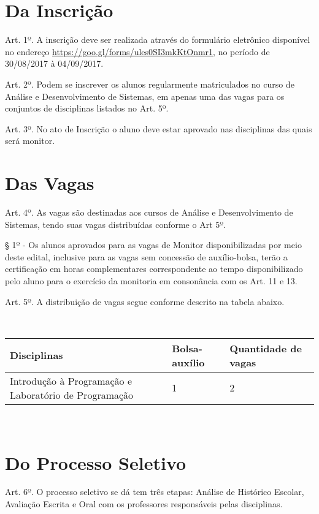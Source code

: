 \documentclass[10pt, oneside]{memoir}
\begin{document}
\section*{Da Inscrição}
\setlength{\parindent}{0em}
\setlength{\parskip}{0.2cm}
{\raggedright
	Art. 1º. A inscrição deve ser realizada através do formulário eletrônico disponível no endereço \url{https://goo.gl/forms/ules0SI3mkKtOnmr1}, no período de 30/08/2017 à 04/09/2017.
	
	Art. 2º. Podem se inscrever os alunos regularmente matriculados no curso de Análise e Desenvolvimento de Sistemas, em apenas uma das vagas para os conjuntos de disciplinas listados no Art. 5º.
	
	Art. 3º. No ato de Inscrição o aluno deve estar aprovado nas disciplinas das quais será monitor.
	
	\section*{Das Vagas}
	
	Art. 4º. As vagas são destinadas aos cursos de Análise e Desenvolvimento de Sistemas, tendo suas vagas distribuídas conforme o Art 5º.
	
	§ 1º - Os alunos aprovados para as vagas de Monitor disponibilizadas por meio deste edital, inclusive para as vagas sem concessão de auxílio-bolsa, terão a certificação em horas complementares correspondente ao tempo disponibilizado pelo aluno para o exercício da monitoria em consonância com os Art. 11 e 13.
	
	Art. 5º. A distribuição de vagas segue conforme descrito na tabela abaixo.
	
	~
	
	\begin{tabu} to \textwidth {X[2]X[r]X[r]}
		Disciplinas&Bolsa-auxílio&Quantidade de vagas\\
		\midrule
		Introdução à Programação e Laboratório de Programação&1&2\\
		\bottomrule
	\end{tabu}
	
	~
	
	\section*{Do Processo Seletivo}
	
	Art. 6º. O processo seletivo se dá tem três etapas: Análise de Histórico Escolar, Avaliação Escrita e Oral com os professores responsáveis pelas disciplinas.
	
}
\end{document}
